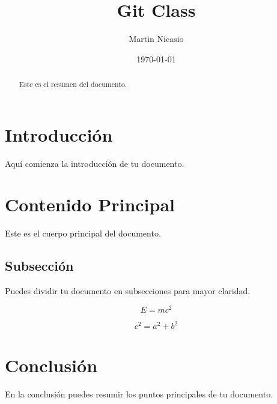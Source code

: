 \documentclass[a4paper,12pt]{article}
\title{Git Class}
\author{Martin Nicasio}
\date{\today}
\begin{document}
\maketitle

\begin{abstract}
Este es el resumen del documento.
\end{abstract}

\section{Introducción}
Aquí comienza la introducción de tu documento.

\section{Contenido Principal}
Este es el cuerpo principal del documento.

\subsection{Subsección}
Puedes dividir tu documento en subsecciones para mayor claridad.

\begin{equation}
E = mc^2
\end{equation}

\begin{equation}
    c^2 = a^2 + b^2
\end{equation}

\section{Conclusión}
En la conclusión puedes resumir los puntos principales de tu documento.
\end{document}
